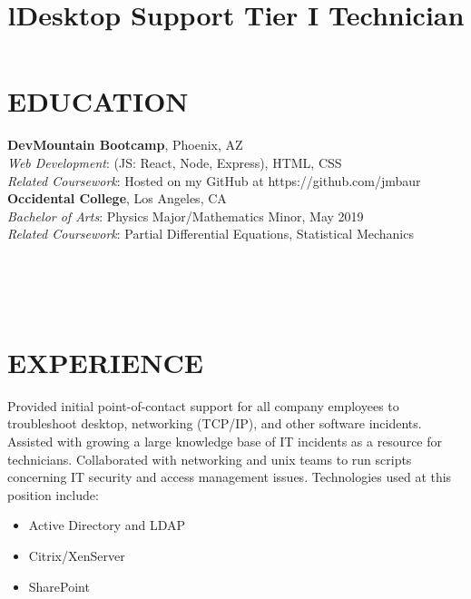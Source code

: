 \documentclass[margin]{res}
\begin{document}
\begin{resume}


\section{EDUCATION}
\textbf{DevMountain Bootcamp}, Phoenix, AZ\\
{\sl Web Development}: (JS: React, Node, Express), HTML, CSS\\
{\sl Related Coursework}: Hosted on my GitHub at https://github.com/jmbaur\\
\textbf{Occidental College}, Los Angeles, CA\\
{\sl Bachelor of Arts}: Physics Major/Mathematics Minor, May 2019\hfill\\
{\sl Related Coursework}: Partial Differential Equations, Statistical Mechanics\\


\begin{format}
\title{l}\\
\\
\body\\
\end{format}

\section{EXPERIENCE}
\title{\textbf{Desktop Support Tier I Technician}}
\begin{position}
	Provided initial point-of-contact support for all company employees to troubleshoot desktop, networking (TCP/IP), and other software incidents. Assisted with growing a large knowledge base of IT incidents as a resource for technicians. Collaborated with networking and unix teams to run scripts concerning IT security and access management issues. Technologies used at this position include:
	\begin{itemize}
		\item Active Directory and LDAP
		\item Citrix/XenServer
		\item SharePoint
	\end{itemize}
\end{position}


\end{resume}
\end{document}
